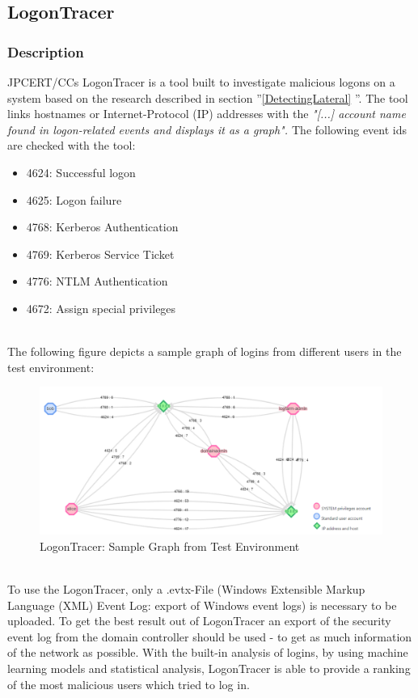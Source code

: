 \subsection{LogonTracer}
\subsubsection{Description}
JPCERT/CCs LogonTracer is a tool built to investigate malicious logons on a system based on the research described in section ''\ref{DetectingLateral} ''. The tool links hostnames or Internet-Protocol (IP) addresses with the \textit{"[...] account name found in logon-related events and displays it as a graph". \cite{LogonTracer}}  The following event ids are checked with the tool: 
\ \\
\begin{multicols}{2}
    \begin{itemize}
        \item 4624: Successful logon
        \item 4625: Logon failure
        \item 4768: Kerberos Authentication
        \item 4769: Kerberos Service Ticket
        \item 4776: NTLM Authentication
        \item 4672: Assign special privileges
    \end{itemize}
\end{multicols} \ \\
The following figure depicts a sample graph of logins from different users in the test environment:
\begin{figure}[H]
    \centering
    \includegraphics[width=0.8\linewidth]{assets/LogonTracer/LogonTrace_LogFarm.png}
    \caption{LogonTracer: Sample Graph from Test Environment}
    \label{fig:LogonTracerSample}
\end{figure}
\ \\
To use the LogonTracer, only a .evtx-File (Windows Extensible Markup Language (XML) Event Log: export of Windows event logs) is necessary to be uploaded. To get the best result out of LogonTracer an export of the security event log from the domain controller should be used - to get as much information of the network as possible. With the built-in analysis of logins, by using machine learning models and statistical analysis, LogonTracer is able to provide a ranking of the most malicious users which tried to log in. \cite{LogonTracerBlog}
